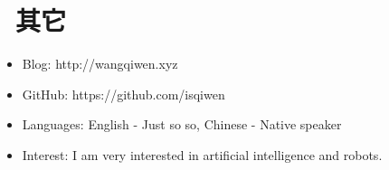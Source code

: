 \documentclass{resume}
\begin{document}



\section{\faInfo\ 其它}
\begin{itemize}[parsep=0.5ex]
  \item Blog: http://wangqiwen.xyz
  \item GitHub: https://github.com/isqiwen
  \item Languages: English - Just so so, Chinese - Native speaker
  \item Interest: I am very interested in artificial intelligence and robots.
\end{itemize}

%
%
\end{document}
